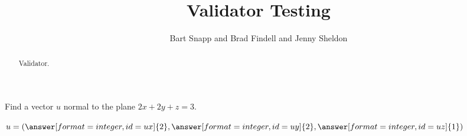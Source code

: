 \documentclass[nooutcomes]{ximera}
\title{Validator Testing}
\author{Bart Snapp and Brad Findell and Jenny Sheldon}
\begin{document}
\begin{abstract}
Validator.
\end{abstract}
\maketitle

\begin{problem}
Find a vector $u$ normal to the plane $2x+2y+z=3$.
  \begin{prompt}
    \begin{validator}[(ux==uy) && (uy==2*uz) && (uy != 0)]
      \(
        u = \left( \answer[format=integer,id=ux]{2}, \answer[format=integer,id=uy]{2}, \answer[format=integer,id=uz]{1} \right)
      \)
    \end{validator}
  \end{prompt}

  \end{problem}
  
\end{document}

